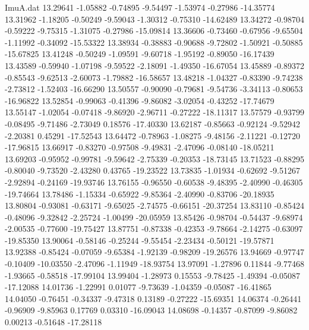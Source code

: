 \begin{filecontents}{ImuA.dat}
  13.29641   -1.05882   -0.74895   -9.54497   -1.53974   -0.27986  -14.35774
  13.31962   -1.18205   -0.50249   -9.59043   -1.30312   -0.75310  -14.62489
  13.34272   -0.98704   -0.59222   -9.75315   -1.31075   -0.27986  -15.09814
  13.36606   -0.73460   -0.67956   -9.65504   -1.11992   -0.34092  -15.53322
  13.38934   -0.38883   -0.90688   -9.72802   -1.50921   -0.50885  -15.67825
  13.41248   -0.50249   -1.09591   -9.60718   -1.95192   -0.89050  -16.17439
  13.43589   -0.59940   -1.07198   -9.59522   -2.18091   -1.49350  -16.67054
  13.45889   -0.89372   -0.85543   -9.62513   -2.60073   -1.79882  -16.58657
  13.48218   -1.04327   -0.83390   -9.74238   -2.73812   -1.52403  -16.66290
  13.50557   -0.90090   -0.79681   -9.54736   -3.34113   -0.80653  -16.96822
  13.52854   -0.99063   -0.41396   -9.86082   -3.02054   -0.43252  -17.74679
  13.55147   -1.02054   -0.07418   -9.86920   -2.96711   -0.27222  -18.11317
  13.57579   -0.93799   -0.08495   -9.71486   -2.73049    0.18576  -17.40330
  13.62187   -0.85663   -0.92124   -9.52942   -2.20381    0.45291  -17.52543
  13.64472   -0.78963   -1.08275   -9.48156   -2.11221   -0.12720  -17.96815
  13.66917   -0.83270   -0.97508   -9.49831   -2.47096   -0.08140  -18.05211
  13.69203   -0.95952   -0.99781   -9.59642   -2.75339   -0.20353  -18.73145
  13.71523   -0.88295   -0.80040   -9.73520   -2.43280    0.43765  -19.23522
  13.73835   -1.01934   -0.62692   -9.51267   -2.92894   -0.24169  -19.93746
  13.76155   -0.96550   -0.60538   -9.48395   -2.40990   -0.46305  -19.74664
  13.78486   -1.15334   -0.65922   -9.85364   -2.40990   -0.83706  -20.18935
  13.80804   -0.93081   -0.63171   -9.65025   -2.74575   -0.66151  -20.37254
  13.83110   -0.85424   -0.48096   -9.32842   -2.25724   -1.00499  -20.05959
  13.85426   -0.98704   -0.54437   -9.68974   -2.00535   -0.77600  -19.75427
  13.87751   -0.87338   -0.42353   -9.78664   -2.14275   -0.63097  -19.85350
  13.90064   -0.58146   -0.25244   -9.55454   -2.23434   -0.50121  -19.57871
  13.92388   -0.85424   -0.07059   -9.65384   -1.92139   -0.98209  -19.26576
  13.94669   -0.97747   -0.10409  -10.03550   -2.47096   -1.11949  -18.93754
  13.97091   -1.27896    0.11844   -9.77468   -1.93665   -0.58518  -17.99104
  13.99404   -1.28973    0.15553   -9.78425   -1.49394   -0.05087  -17.12088
  14.01736   -1.22991    0.01077   -9.73639   -1.04359   -0.05087  -16.41865
  14.04050   -0.76451   -0.34337   -9.47318    0.13189   -0.27222  -15.69351
  14.06374   -0.26441   -0.96909   -9.85963    0.17769    0.03310  -16.09043
  14.08698   -0.14357   -0.87099   -9.86082    0.00213   -0.51648  -17.28118

\end{filecontents}
